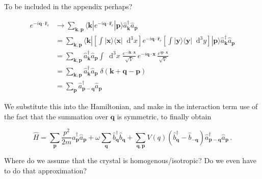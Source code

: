 \documentclass[12pt]{report}
\renewcommand{\vec}[1]{\boldsymbol{\mathbf{#1}}}                        %
\newcommand*\diff{\mathop{}\!\mathrm{d}}
\newcommand{\motivation}[1]{{\leavevmode\color{motivation}#1}}
\newcommand{\question}[1]{{\leavevmode\color{question}#1}}
\begin{document}
\motivation{
To be included in the appendix perhaps?

\begin{equation}
	\begin{split}
		e^{-i \vec q \cdot \hat{ \vec r}_\text{e}}
		& \rightarrow \sum_{\vec k, \vec p} \langle \vec k | e^{-i \vec q \cdot \hat{ \vec r}_\text{e}} | \vec p \rangle \hat a^\dagger_{\vec k} \hat a_{\vec p} \\
		& = \sum_{\vec k, \vec p} \langle \vec k |
			\left[ \int | \vec x \rangle \langle \vec x | \diff^3 x \right]
			e^{-i \vec q \cdot \hat{ \vec r}_\text{e}}
			\left[ \int | \vec y \rangle \langle \vec y | \diff^3 y \right]
			| \vec p \rangle \hat a^\dagger_{\vec k} \hat a_{\vec p} \\
		& = \sum_{\vec k, \vec p} \hat a^\dagger_{\vec k} \hat a_{\vec p}
			\int \diff^3 x \;
			\frac{e^{- i \vec k \cdot \vec x}}{\sqrt{V}} \,
			e^{-i \vec q \cdot \vec x} \,
			 \frac{e^{i \vec p \cdot \vec x}}{\sqrt{V}} \\
		& = \sum_{\vec k, \vec p} \hat a^\dagger_{\vec k} \hat a_{\vec p}
			\; \delta( \vec k + \vec q - \vec p) \\
		& = \sum_{\vec p} \hat a^\dagger_{\vec p - \vec q} \hat a_{\vec p}
	\end{split}
\end{equation}
}

We substitute this into the Hamiltonian, and make in the interaction term use of the fact that the summation over $ \vec q $ is symmetric, to finally obtain

\begin{equation}
	\hat H
	= \sum_{\vec p} \frac{p^2}{2m} \hat a^\dagger_{\vec p} \hat a_{\vec p}
	+ \omega \sum_{\vec q} \hat b^\dagger_{\vec q} \hat b_{\vec q}
	+  \sum_{\vec q, \vec p} V (q) \left( \hat b^\dagger_{\vec q} - \hat b_{- \vec q} \right) \hat a^\dagger_{\vec p - \vec q} \hat a_{\vec p} \,.
\end{equation}

\question{Where do we assume that the crystal is homogenous/isotropic? Do we even have to do that approximation?}
\end{document}
